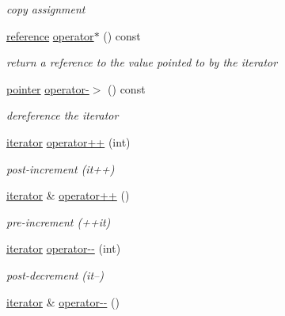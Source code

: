 \begin{DoxyCompactItemize}
\begin{DoxyCompactList}\small\item\em copy assignment \end{DoxyCompactList}\item 
\hyperlink{classnlohmann_1_1basic__json_1_1const__iterator_aefd248cac6493eed1e6ff53ba6a63eb2}{reference} \hyperlink{classnlohmann_1_1basic__json_1_1iterator_acbd82115f9232c3d3b5dacc78315b9da}{operator$\ast$} () const 
\begin{DoxyCompactList}\small\item\em return a reference to the value pointed to by the iterator \end{DoxyCompactList}\item 
\hyperlink{classnlohmann_1_1basic__json_1_1const__iterator_a1da96fc3054d547e7706d3a2f073f389}{pointer} \hyperlink{classnlohmann_1_1basic__json_1_1iterator_a8de46badb5b2177c85c672a71bcca017}{operator-\/$>$} () const 
\begin{DoxyCompactList}\small\item\em dereference the iterator \end{DoxyCompactList}\item 
\hyperlink{classnlohmann_1_1basic__json_1_1iterator}{iterator} \hyperlink{classnlohmann_1_1basic__json_1_1iterator_a2943e49b3d88e6ee5793c5923ab2ede9}{operator++} (int)
\begin{DoxyCompactList}\small\item\em post-\/increment (it++) \end{DoxyCompactList}\item 
\hyperlink{classnlohmann_1_1basic__json_1_1iterator}{iterator} \& \hyperlink{classnlohmann_1_1basic__json_1_1iterator_a050b7fa21051ea57e5b0cc03668b5d4a}{operator++} ()
\begin{DoxyCompactList}\small\item\em pre-\/increment (++it) \end{DoxyCompactList}\item 
\hyperlink{classnlohmann_1_1basic__json_1_1iterator}{iterator} \hyperlink{classnlohmann_1_1basic__json_1_1iterator_ab4f238aa5fcf452b1884b748b0395b1f}{operator-\/-\/} (int)
\begin{DoxyCompactList}\small\item\em post-\/decrement (it--) \end{DoxyCompactList}\item 
\hyperlink{classnlohmann_1_1basic__json_1_1iterator}{iterator} \& \hyperlink{classnlohmann_1_1basic__json_1_1iterator_ab3679dc63b3a59edb98b1c2b96d8683c}{operator-\/-\/} ()

\end{DoxyCompactItemize}
